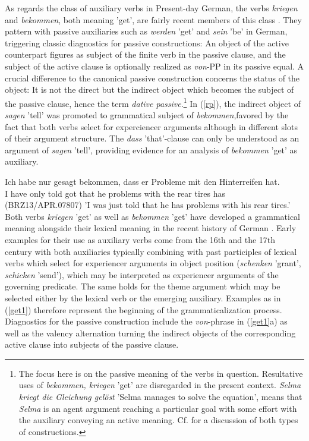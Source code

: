 \documentclass[output=paper]{langsci/langscibook}
\begin{document}
As regards the class of auxiliary verbs in Present-day German, the verbs \textit{kriegen} and \textit{bekommen}, both meaning 'get', are fairly recent members of this class \citep{reis1976}. They pattern with passive auxiliaries such as \textit{werden} 'get' and \textit{sein} 'be' in German, triggering classic diagnostics for passive constructions: An object of the  active counterpart figures as subject of the finite verb in the passive clause, and the subject of the active clause is optionally realized as \textit{von}-PP in its passive equal. A crucial difference to the canonical passive construction concerns the status of the object: It is not the direct but the indirect object which becomes the subject of the passive clause, hence the term \textit{dative passive}.\footnote{The focus here is on the passive meaning of the verbs in question. Resultative uses of \textit{bekommen, kriegen} 'get' are disregarded in the present context. \textit{Selma kriegt die Gleichung gelöst} 'Selma manages to solve the equation', means that \textit{Selma} is an agent argument reaching a particular goal with some effort with the auxiliary conveying an active meaning. Cf. \cite{reis1985a} for a discussion of both types of constructions.}  In (\ref{rp}), the indirect object of \textit{sagen} 'tell'  was promoted to grammatical subject of \textit{bekommen},favored by the fact that both verbs select for experciencer arguments although in different slots of their argument structure. The \textit{dass} 'that'-clause can only be understood as an argument of \textit{sagen} 'tell', providing evidence for an analysis of \textit{bekommen} 'get' as auxiliary.
  
\ea \label{rp} 
\gll  Ich habe nur gesagt bekommen, dass er Probleme mit den Hinterreifen hat.  \\  I have only told got that he problems with the {rear tires} has \\ \hfill  (BRZ13/APR.07807)
\glt 'I was just told that he has problems with his rear tires.'
\z
Both verbs \textit{kriegen} 'get' as well as \textit{bekommen} 'get' have developed a grammatical meaning alongside their lexical meaning in the recent history of German \citep{glaser2005, lenz2012}. Early examples for their use as auxiliary verbs come from the 16th and the 17th century with both auxiliaries typically combining with past participles of lexical verbs which select for experiencer arguments in object position (\textit{schenken} 'grant', \textit{schicken} 'send'), which may be interpreted as experiencer arguments of the governing predicate. The same holds for the theme argument which may be selected either by the lexical verb or the emerging auxiliary. Examples as in (\ref{get1}) therefore represent the beginning of the grammaticalization process. Diagnostics for the passive construction include the \textit{von}-phrase in (\ref{get1}a) as well as the valency alternation turning the indirect objects of the corresponding active clause into subjects of the passive clause.
\end{document}
